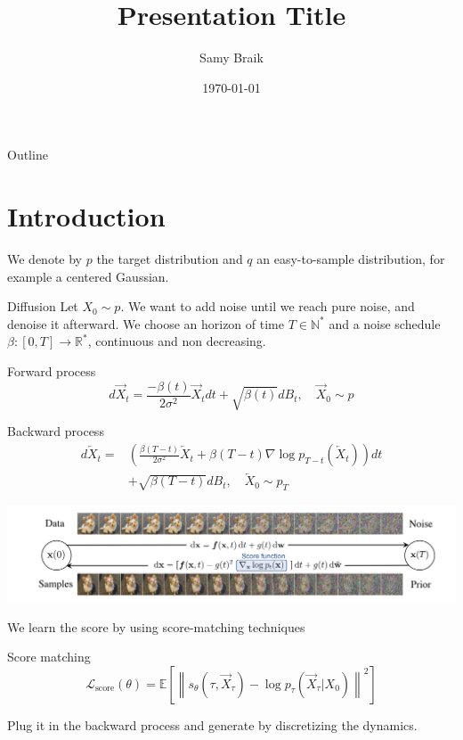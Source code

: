 \documentclass{beamer}
\title{Presentation Title}
\author{Samy Braik}
\date{\today}
\begin{document}
\begin{frame}
    \titlepage
\end{frame}

\begin{frame}{Outline}
    \tableofcontents
\end{frame}

\section{Introduction}

\begin{frame}
    We denote by \(p\) the target distribution and \(q\) an easy-to-sample distribution, for example a centered Gaussian.
\end{frame}

\begin{frame}{Diffusion}
    Let \(X_0\sim p\). We want to add noise until we reach pure noise, and denoise it afterward. We choose an horizon of time \(T\in\mathbb{N}^*\) and a noise schedule \(\beta:[0,T]\rightarrow\mathbb{R}^*\), continuous and non decreasing.

    \begin{block}{Forward process}
            \[d\overrightarrow{X}_t = \frac{-\beta(t)}{2\sigma^2}\overrightarrow{X}_t dt + \sqrt{\beta(t)}dB_t, \quad \overrightarrow{X}_0\sim p\]
    \end{block}

    \begin{block}{Backward process}
        \begin{align*}
            d\overleftarrow{X}_t=&\left(  \frac{\beta(T-t)}{2\sigma^2}\overleftarrow{X}_t+\beta(T-t)\nabla\log p_{T-t}\left(\overleftarrow{X}_t \right)  \right)dt \\ &+ \sqrt{\beta(T-t)}dB_t, \quad \overleftarrow{X}_0\sim p_T
        \end{align*}
            
    \end{block}
\end{frame}

\begin{frame}
    \includegraphics[width=1\linewidth]{score_based_dog.png}
    \bigskip

    We learn the score by using score-matching techniques
    \begin{block}{Score matching}
        \[\mathcal{L}_\text{score}(\theta)=\mathbb{E}\left[ \left\| s_\theta \left(\tau,\overrightarrow{X}_\tau \right)-\log p_\tau \left(\overrightarrow{X}_\tau|X_0 \right)\right\|^2  \right]   \]
    \end{block}
    Plug it in the backward process and generate by discretizing the dynamics.
\end{frame}
\end{document}
